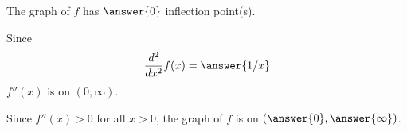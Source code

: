 \documentclass{ximera}
\begin{document}
\begin{exercise}
\begin{exercise}
\begin{exercise}
\begin{exercise}
\begin{exercise}
\begin{exercise}
\begin{exercise}
\begin{exercise}
\begin{exercise}
The graph of $f$ has $\answer{0}$ inflection point(s).
\begin{exercise}
Since
\[
\frac{d^2}{dx^2}f(x)=\answer{1/x}
\]
$f''(x)$ is  on $(0,\infty)$. 
\begin{exercise}
Since $f''(x)>0$ for all $x>0$, the graph of $f$ is  on $\left( \answer{0},\answer{\infty} \right)$.
\end{exercise}
\end{exercise}
\end{exercise}
\end{exercise}
\end{exercise}
\end{exercise}
\end{exercise}
\end{exercise}
\end{exercise}
\end{exercise}
\end{exercise}
\end{document}
